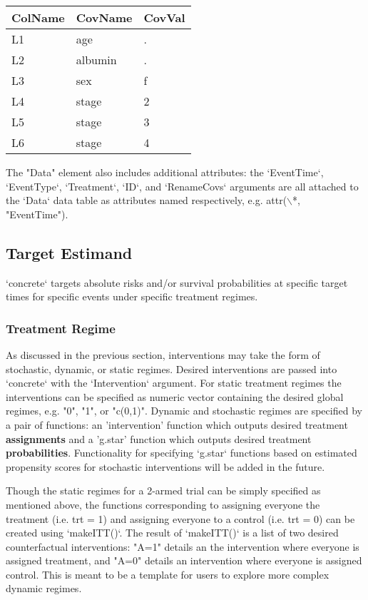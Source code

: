 \documentclass{report}
\newcommand{\1}{\ensuremath{\mathbf{1}}}
\begin{document}
\begin{center}
\begin{tabular}{lll}
ColName & CovName & CovVal\\
\hline
L1 & age & .\\
L2 & albumin & .\\
L3 & sex & f\\
L4 & stage & 2\\
L5 & stage & 3\\
L6 & stage & 4\\
\end{tabular}
\end{center}

The "Data" element also includes additional attributes: the `EventTime`, `EventType`, `Treatment`, `ID`, and `RenameCovs` arguments are all attached to the `Data` data table as attributes named respectively, e.g. attr($\backslash$*, "EventTime").

\subsection{Target Estimand}
\label{sec:org3f59c69}
`concrete` targets absolute risks and/or survival probabilities at specific target times for specific events under specific treatment regimes. 

\subsubsection{Treatment Regime}
\label{sec:orgaa507a1}
As discussed in the previous section, interventions may take the form of stochastic, dynamic, or static regimes. Desired interventions are passed into `concrete` with the `Intervention` argument. For static treatment regimes the interventions can be specified as numeric vector containing the desired global regimes, e.g. "0", "1", or "c(0,1)". Dynamic and stochastic regimes are specified by a pair of functions: an 'intervention' function which outputs desired treatment \textbf{assignments} and a 'g.star' function which outputs desired treatment \textbf{probabilities}. Functionality for specifying `g.star` functions based on estimated propensity scores for stochastic interventions will be added in the future.

Though the static regimes for a 2-armed trial can be simply specified as mentioned above, the functions corresponding to assigning everyone the treatment (i.e. trt = 1) and assigning everyone to a control (i.e. trt = 0) can be created using `makeITT()`. The result of `makeITT()` is a list of two desired counterfactual interventions: "A=1" details an the intervention where everyone is assigned treatment, and "A=0" details an intervention where everyone is assigned control. This is meant to be a template for users to explore more complex dynamic regimes.
\end{document}
